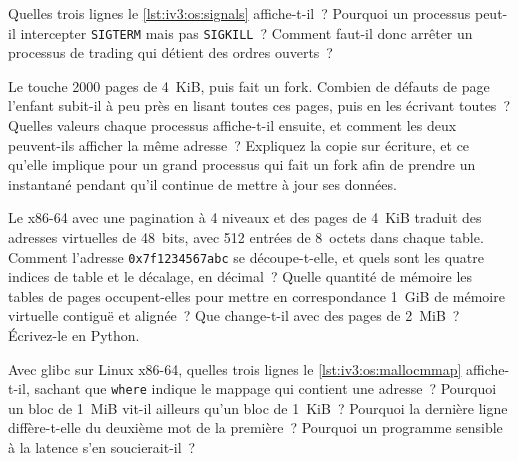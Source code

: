 \begin{question}\label{iq:iv3:operating-systems-concurrency-and-networks:8}
Quelles trois lignes le \cref{lst:iv3:os:signals} affiche-t-il~? Pourquoi un processus peut-il intercepter \texttt{SIGTERM} mais pas \texttt{SIGKILL}~? Comment faut-il donc arrêter un processus de trading qui détient des ordres ouverts~?
\label{lst:iv3:os:signals}
\end{question}

\begin{question}\label{iq:iv3:operating-systems-concurrency-and-networks:9}
Le  touche 2000 pages de 4~KiB, puis fait un fork. Combien de défauts de page l'enfant subit-il à peu près en lisant toutes ces pages, puis en les écrivant toutes~? Quelles valeurs chaque processus affiche-t-il ensuite, et comment les deux peuvent-ils afficher la même adresse~? Expliquez la copie sur écriture, et ce qu'elle implique pour un grand processus qui fait un fork afin de prendre un instantané pendant qu'il continue de mettre à jour ses données.
\label{lst:iv3:os:cow}
\end{question}

\begin{question}\label{iq:iv3:operating-systems-concurrency-and-networks:10}
Le x86-64 avec une pagination à 4 niveaux et des pages de 4~KiB traduit des adresses virtuelles de 48~bits, avec 512 entrées de 8~octets dans chaque table. Comment l'adresse \texttt{0x7f1234567abc} se découpe-t-elle, et quels sont les quatre indices de table et le décalage, en décimal~? Quelle quantité de mémoire les tables de pages occupent-elles pour mettre en correspondance 1~GiB de mémoire virtuelle contiguë et alignée~? Que change-t-il avec des pages de 2~MiB~? Écrivez-le en Python.
\end{question}

\begin{question}\label{iq:iv3:operating-systems-concurrency-and-networks:11}
Avec glibc sur Linux x86-64, quelles trois lignes le \cref{lst:iv3:os:mallocmmap} affiche-t-il, sachant que \texttt{where} indique le mappage qui contient une adresse~? Pourquoi un bloc de 1~MiB vit-il ailleurs qu'un bloc de 1~KiB~? Pourquoi la dernière ligne diffère-t-elle du deuxième mot de la première~? Pourquoi un programme sensible à la latence s'en soucierait-il~?
\label{lst:iv3:os:mallocmmap}
\end{question}


